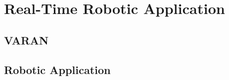 \documentclass[MMR,Master,english]{twbook}
\begin{document}
\clearpage

\chapter{Real-Time Robotic Application}\label{cha:real-time-testing}

\section{VARAN}
\section{Robotic Application}
\clearpage

\end{document}
